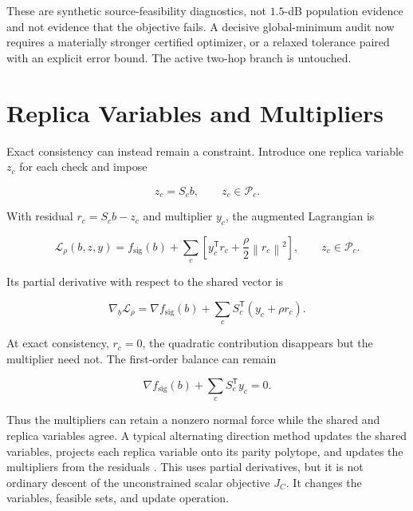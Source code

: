 \documentclass[11pt]{article}
\theoremstyle{remark}
\newcommand{\Pc}{\mathcal{P}_c}
\newcommand{\norm}[1]{\left\lVert#1\right\rVert}
\newcommand{\trans}{\mathsf{T}}
\begin{document}
These are synthetic source-feasibility diagnostics, not $1.5$-dB population
evidence and not evidence that the objective fails.  A decisive
global-minimum audit now requires a materially stronger certified optimizer,
or a relaxed tolerance paired with an explicit error bound.  The active
two-hop branch is untouched.

\section{Replica Variables and Multipliers}

Exact consistency can instead remain a constraint.  Introduce one replica
variable $z_c$ for each check and impose

\begin{equation}
z_c=S_cb,
\qquad
z_c\in\Pc.
\label{eq:replicas}
\end{equation}

With residual $r_c=S_cb-z_c$ and multiplier $y_c$, the augmented Lagrangian is

\begin{equation}
\mathcal{L}_\rho(b,z,y)
=f_{\mathrm{sig}}(b)
+\sum_c\left[
y_c^{\trans}r_c+\frac{\rho}{2}\norm{r_c}^2
\right],
\qquad z_c\in\Pc.
\label{eq:augmented}
\end{equation}

Its partial derivative with respect to the shared vector is

\begin{equation}
\nabla_b\mathcal{L}_\rho
=\nabla f_{\mathrm{sig}}(b)
+\sum_cS_c^{\trans}(y_c+\rho r_c).
\label{eq:augmented-gradient}
\end{equation}

At exact consistency, $r_c=0$, the quadratic contribution disappears but the
multiplier need not.  The first-order balance can remain

\begin{equation}
\nabla f_{\mathrm{sig}}(b)
+\sum_cS_c^{\trans}y_c=0.
\end{equation}

Thus the multipliers can retain a nonzero normal force while the shared and
replica variables agree.  A typical alternating direction method updates
the shared variables, projects each replica variable onto its parity
polytope, and updates the multipliers from the residuals
\cite{boyd2011admm,barman2013decomposition}.  This uses partial derivatives,
but it is not ordinary descent of the unconstrained scalar objective $J_C$.
It changes the variables, feasible sets, and update operation.
\end{document}
